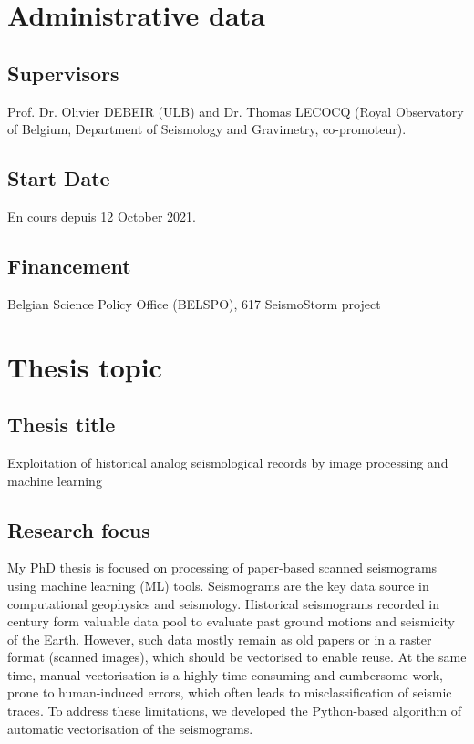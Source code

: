 \documentclass[a4paper,english,12pt]{article}
\begin{document}
\newpage

\pagestyle{fancy}
\fancyhf{}
\cfoot{\thepage}

\newpage
\section*{}
\tableofcontents 


\section{Administrative data}
\subsection{Supervisors}
Prof. Dr. Olivier DEBEIR (ULB) and Dr. Thomas LECOCQ (Royal Observatory of Belgium, Department of Seismology and Gravimetry, co-promoteur).

\subsection{Start Date}
En cours depuis 12 October 2021.

\subsection{Financement}
Belgian Science Policy Office (BELSPO), 617 SeismoStorm project

\section{Thesis topic}
\subsection{Thesis title}
Exploitation of historical analog seismological records by image processing and machine learning

\subsection{Research focus}
My PhD thesis is focused on processing of paper-based scanned seismograms using machine learning (ML) tools. Seismograms are the key data source in computational geophysics and seismology. Historical seismograms recorded in  century form valuable data pool to evaluate past ground motions and seismicity of the Earth. However, such data mostly remain as old papers or in a raster format (scanned images), which should be vectorised to enable reuse. At the same time, manual vectorisation is a highly time‐consuming and cumbersome work, prone to human-induced errors, which often leads to misclassification of seismic traces. To address these limitations, we developed the Python-based algorithm of automatic vectorisation of the seismograms. 
\end{document}
